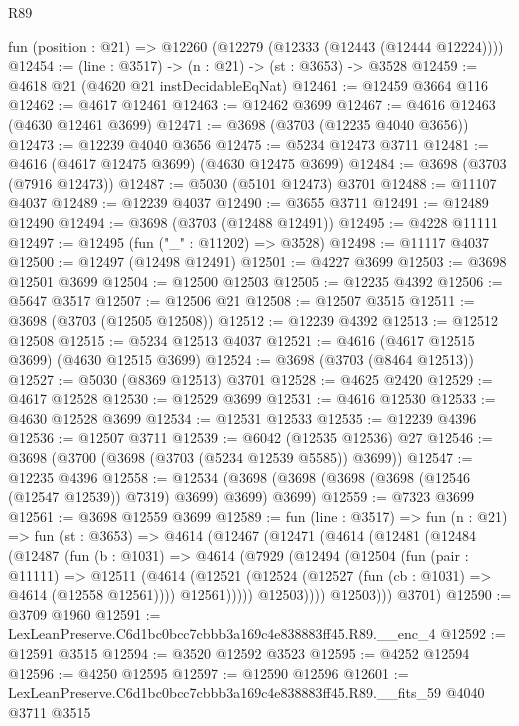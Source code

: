 \begin{lexlean}{R89}
\begin{coremodule}
  fun (position : @21) => @12260 (@12279 (@12333 (@12443 (@12444 @12224))))
@12454 := (line : @3517) -> (n : @21) -> (st : @3653) -> @3528
@12459 := @4618 @21 (@4620 @21 instDecidableEqNat)
@12461 := @12459 @3664 @116
@12462 := @4617 @12461
@12463 := @12462 @3699
@12467 := @4616 @12463 (@4630 @12461 @3699)
@12471 := @3698 (@3703 (@12235 @4040 @3656))
@12473 := @12239 @4040 @3656
@12475 := @5234 @12473 @3711
@12481 := @4616 (@4617 @12475 @3699) (@4630 @12475 @3699)
@12484 := @3698 (@3703 (@7916 @12473))
@12487 := @5030 (@5101 @12473) @3701
@12488 := @11107 @4037
@12489 := @12239 @4037
@12490 := @3655 @3711
@12491 := @12489 @12490
@12494 := @3698 (@3703 (@12488 @12491))
@12495 := @4228 @11111
@12497 := @12495 (fun ("_" : @11202) => @3528)
@12498 := @11117 @4037
@12500 := @12497 (@12498 @12491)
@12501 := @4227 @3699
@12503 := @3698 @12501 @3699
@12504 := @12500 @12503
@12505 := @12235 @4392
@12506 := @5647 @3517
@12507 := @12506 @21
@12508 := @12507 @3515
@12511 := @3698 (@3703 (@12505 @12508))
@12512 := @12239 @4392
@12513 := @12512 @12508
@12515 := @5234 @12513 @4037
@12521 := @4616 (@4617 @12515 @3699) (@4630 @12515 @3699)
@12524 := @3698 (@3703 (@8464 @12513))
@12527 := @5030 (@8369 @12513) @3701
@12528 := @4625 @2420
@12529 := @4617 @12528
@12530 := @12529 @3699
@12531 := @4616 @12530
@12533 := @4630 @12528 @3699
@12534 := @12531 @12533
@12535 := @12239 @4396
@12536 := @12507 @3711
@12539 := @6042 (@12535 @12536) @27
@12546 := @3698 (@3700 (@3698 (@3703 (@5234 @12539 @5585)) @3699))
@12547 := @12235 @4396
@12558 := @12534 (@3698 (@3698 (@3698 (@3698 (@12546 (@12547 @12539)) @7319) @3699) @3699) @3699)
@12559 := @7323 @3699
@12561 := @3698 @12559 @3699
@12589 := fun (line : @3517) =>
  fun (n : @21) =>
  fun (st : @3653) =>
  @4614
    (@12467
      (@12471
        (@4614
          (@12481
            (@12484
              (@12487
                (fun (b : @1031) =>
                @4614
                  (@7929
                    (@12494
                      (@12504
                        (fun (pair : @11111) =>
                        @12511
                          (@4614
                            (@12521
                              (@12524 (@12527 (fun (cb : @1031) => @4614 (@12558 @12561))))
                              @12561)))))
                    @12503))))
            @12503)))
      @3701)
@12590 := @3709 @1960
@12591 := LexLeanPreserve.C6d1bc0bcc7cbbb3a169c4e838883ff45.R89.__enc_4
@12592 := @12591 @3515
@12594 := @3520 @12592 @3523
@12595 := @4252 @12594
@12596 := @4250 @12595
@12597 := @12590 @12596
@12601 := LexLeanPreserve.C6d1bc0bcc7cbbb3a169c4e838883ff45.R89.__fits_59 @4040 @3711 @3515

\end{coremodule}
\end{lexlean}
